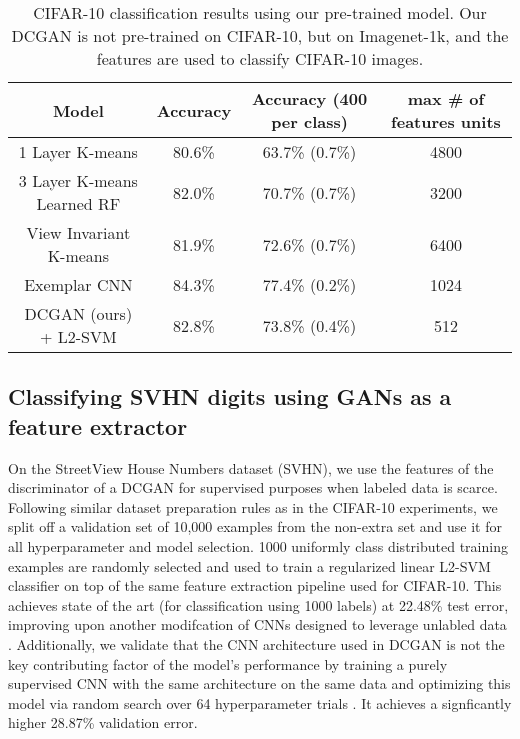\documentclass{article} \usepackage{iclr2016_conference,times}
\begin{document}
\begin{table}[h]
\caption{CIFAR-10 classification results using our pre-trained model. Our DCGAN is not pre-trained on CIFAR-10, but on Imagenet-1k, and the features are used to classify CIFAR-10 images.}
\begin{center}
\begin{tabular}{ |c|c|c|c| }
    \hline
    \textbf{Model} & Accuracy & Accuracy (400 per class) & max \# of features units\\
    \hline
    1 Layer K-means & 80.6\% & 63.7\% (0.7\%) & 4800\\
    3 Layer K-means Learned RF & 82.0\% & 70.7\% (0.7\%) & 3200\\
    View Invariant K-means & 81.9\% & 72.6\% (0.7\%) & 6400\\
    Exemplar CNN & 84.3\% & 77.4\% (0.2\%) & 1024\\
    \hline
    DCGAN (ours) + L2-SVM & 82.8\% & 73.8\% (0.4\%) & 512\\
    \hline
\end{tabular}
\end{center}
\label{tab:cifar10_results}
\end{table}

\subsection{Classifying SVHN digits using GANs as a feature extractor}

On the StreetView House Numbers dataset (SVHN)\citep{netzer2011reading}, we use the features of the discriminator of a DCGAN for supervised purposes when labeled data is scarce. Following similar dataset preparation rules as in the CIFAR-10 experiments, we split off a validation set of 10,000 examples from the non-extra set and use it for all hyperparameter and model selection. 1000 uniformly class distributed training examples are randomly selected and used to train a regularized linear L2-SVM classifier on top of the same feature extraction pipeline used for CIFAR-10. This achieves state of the art (for classification using 1000 labels) at 22.48\% test error, improving upon another modifcation of CNNs designed to leverage unlabled data \citep{zhao2015stacked}. Additionally, we validate that the CNN architecture used in DCGAN is not the key contributing factor of the model's performance by training a purely supervised CNN with the same architecture on the same data and optimizing this model via random search over 64 hyperparameter trials \citep{bergstra2012hpopt}. It achieves a signficantly higher 28.87\% validation error.
\end{document}
